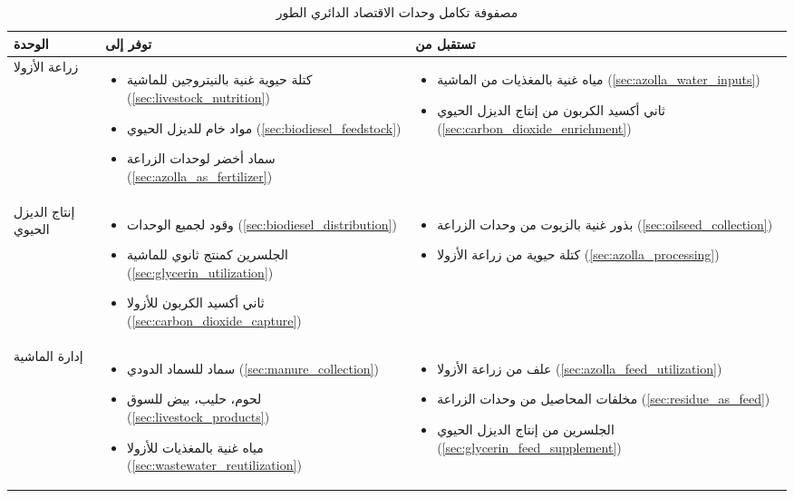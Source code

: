 \begin{table}[h]
\centering
\caption{مصفوفة تكامل وحدات الاقتصاد الدائري الطور}
\label{tab:integration_matrix_ar}
\begin{tabular}{|p{2.5cm}|p{5cm}|p{5cm}|}
\hline
\textbf{الوحدة} & \textbf{توفر إلى} & \textbf{تستقبل من} \\
\hline
زراعة الأزولا & 
\begin{itemize}
    \item كتلة حيوية غنية بالنيتروجين للماشية (\ref{sec:livestock_nutrition})
    \item مواد خام للديزل الحيوي (\ref{sec:biodiesel_feedstock})
    \item سماد أخضر لوحدات الزراعة (\ref{sec:azolla_as_fertilizer})
\end{itemize} & 
\begin{itemize}
    \item مياه غنية بالمغذيات من الماشية (\ref{sec:azolla_water_inputs})
    \item ثاني أكسيد الكربون من إنتاج الديزل الحيوي (\ref{sec:carbon_dioxide_enrichment})
\end{itemize} \\
\hline
إنتاج الديزل الحيوي & 
\begin{itemize}
    \item وقود لجميع الوحدات (\ref{sec:biodiesel_distribution})
    \item الجلسرين كمنتج ثانوي للماشية (\ref{sec:glycerin_utilization})
    \item ثاني أكسيد الكربون للأزولا (\ref{sec:carbon_dioxide_capture})
\end{itemize} & 
\begin{itemize}
    \item بذور غنية بالزيوت من وحدات الزراعة (\ref{sec:oilseed_collection})
    \item كتلة حيوية من زراعة الأزولا (\ref{sec:azolla_processing})
\end{itemize} \\
\hline
إدارة الماشية & 
\begin{itemize}
    \item سماد للسماد الدودي (\ref{sec:manure_collection})
    \item لحوم، حليب، بيض للسوق (\ref{sec:livestock_products})
    \item مياه غنية بالمغذيات للأزولا (\ref{sec:wastewater_reutilization})
\end{itemize} & 
\begin{itemize}
    \item علف من زراعة الأزولا (\ref{sec:azolla_feed_utilization})
    \item مخلفات المحاصيل من وحدات الزراعة (\ref{sec:residue_as_feed})
    \item الجلسرين من إنتاج الديزل الحيوي (\ref{sec:glycerin_feed_supplement})
\end{itemize} \\
\hline
\end{tabular}
\end{table}

